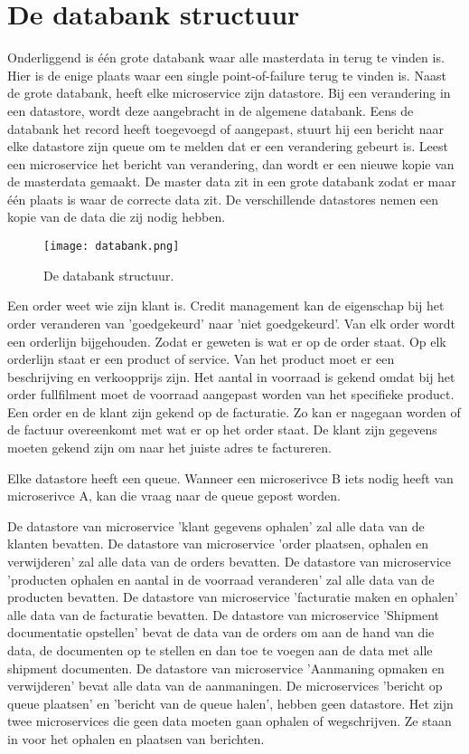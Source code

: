 \section{De databank structuur}
Onderliggend is één grote databank waar alle masterdata in terug te vinden is. Hier is de enige plaats waar een single point-of-failure terug te vinden is. Naast de grote databank, heeft elke microservice zijn datastore. Bij een verandering in een datastore, wordt deze aangebracht in de algemene databank. Eens de databank het record heeft toegevoegd of aangepast, stuurt hij een bericht naar elke datastore zijn queue om te melden dat er een verandering gebeurt is. Leest een microservice het bericht van verandering, dan wordt er een nieuwe kopie van de masterdata gemaakt. 
De master data zit in een grote databank zodat er maar één plaats is waar de correcte data zit. De verschillende datastores nemen een kopie van de data die zij nodig hebben. 
\begin{figure}[h]
	\texttt{[image: databank.png]}
	\caption{De databank structuur.}
	\centering
\end{figure}

Een order weet wie zijn klant is. Credit management kan de eigenschap bij het order veranderen van 'goedgekeurd' naar 'niet goedgekeurd'. Van elk order wordt een orderlijn bijgehouden. Zodat er geweten is wat er op de order staat. Op elk orderlijn staat er een product of service. Van het product moet er een beschrijving en verkoopprijs zijn. Het aantal in voorraad is gekend omdat bij het order fullfilment moet de voorraad aangepast worden van het specifieke product. Een order en de klant zijn gekend op de facturatie. Zo kan er nagegaan worden of de factuur overeenkomt met wat er op het order staat. De klant zijn gegevens moeten gekend zijn om naar het juiste adres te factureren.

Elke datastore heeft een queue. Wanneer een microserivce B iets nodig heeft van microserivce A, kan die vraag naar de queue gepost worden.

De datastore van microservice 'klant gegevens ophalen' zal alle data van de klanten bevatten.
De datastore van microservice 'order plaatsen, ophalen en verwijderen' zal alle data van de orders bevatten.
De datastore van microservice 'producten ophalen en aantal in de voorraad veranderen' zal alle data van de producten bevatten.
De datastore van microservice 'facturatie maken en ophalen' alle data van de facturatie bevatten.
De datastore van microservice 'Shipment documentatie opstellen' bevat de data van de orders om aan de hand van die data, de documenten op te stellen en dan toe te voegen aan de data met alle shipment documenten.
De datastore van microservice 'Aanmaning opmaken en verwijderen' bevat alle data van de aanmaningen. 
De microservices 'bericht op queue plaatsen' en 'bericht van de queue halen', hebben geen datastore. Het zijn twee microservices die geen data moeten gaan ophalen of wegschrijven. Ze staan in voor het ophalen en plaatsen van berichten. 

